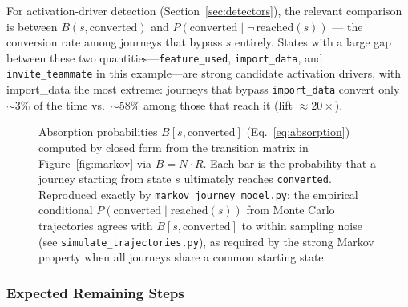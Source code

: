 \documentclass[12pt, a4paper]{article}
\begin{document}
For activation-driver detection (Section~\ref{sec:detectors}), the relevant comparison is between $B(s, \text{converted})$ and $P(\text{converted} \mid \neg\,\text{reached}(s))$ --- the conversion rate among journeys that bypass $s$ entirely. States with a large gap between these two quantities---\texttt{feature\_used}, \texttt{import\_data}, and \texttt{invite\_teammate} in this example---are strong candidate activation drivers, with import\_data the most extreme: journeys that bypass \texttt{import\_data} convert only $\sim$3\% of the time vs.\ $\sim$58\% among those that reach it (lift $\approx 20\times$).

\begin{figure}[htbp]
\centering
{}
\caption{Absorption probabilities $B[s, \text{converted}]$
(Eq.~\eqref{eq:absorption}) computed by closed form from the transition
matrix in Figure~\ref{fig:markov} via $B = N \cdot R$. Each bar is the
probability that a journey starting from state $s$ ultimately reaches
\texttt{converted}. Reproduced exactly by \texttt{markov\_journey\_model.py};
the empirical conditional $P(\text{converted} \mid \text{reached}(s))$ from
Monte Carlo trajectories agrees with $B[s, \text{converted}]$ to within
sampling noise (see \texttt{simulate\_trajectories.py}), as required by the
strong Markov property when all journeys share a common starting state.}
\label{fig:absorption}
\end{figure}

\subsubsection{Expected Remaining Steps}
\end{document}
